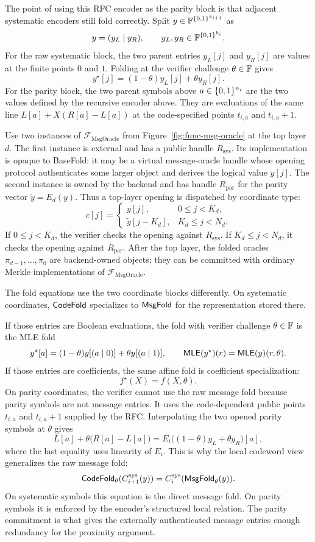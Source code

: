 The point of using this RFC encoder as the parity block is that adjacent
systematic encoders still fold correctly.  Split
$y\in\mathbb{F}^{\{0,1\}^{k_{i+1}}}$ as
\[
  y=(y_L\mid y_R),
  \qquad
  y_L,y_R\in\mathbb{F}^{\{0,1\}^{k_i}}.
\]
For the raw systematic block, the two parent entries
$y_L[j]$ and $y_R[j]$ are values at the finite points $0$ and $1$.  Folding at
the verifier challenge $\theta\in\mathbb{F}$ gives
\[
  y^\star[j]=(1-\theta)y_L[j]+\theta y_R[j].
\]
For the parity block, the two parent symbols above $a\in\{0,1\}^{n_i}$ are the two
values defined by the recursive encoder above.  They are evaluations of the same
line $L[a]+X(R[a]-L[a])$ at the code-specified points $t_{i,a}$ and
$t_{i,a}+1$.

Use two instances of $\mathcal F_{\mathrm{MsgOracle}}$ from
Figure~\ref{fig:func-msg-oracle} at the top layer $d$.  The first instance is
external and has a public handle $R_{\mathrm{sys}}$.  Its implementation is
opaque to BaseFold: it may be a virtual message-oracle handle whose opening
protocol authenticates some larger object and derives the logical value $y[j]$.  The
second instance is owned by the backend and has handle $R_{\mathrm{par}}$ for
the parity vector $\widetilde y=E_d(y)$.  Thus a top-layer opening is dispatched
by coordinate type:
\[
  c[j]=
  \begin{cases}
    y[j], & 0\le j<K_d,\\
    \widetilde y[j-K_d], & K_d\le j<N_d.
  \end{cases}
\]
If $0\le j<K_d$, the verifier checks the opening against $R_{\mathrm{sys}}$.
If $K_d\le j<N_d$, it checks the opening against $R_{\mathrm{par}}$.
After the top layer, the folded oracles
$\pi_{d-1},\ldots,\pi_0$ are backend-owned objects; they can be committed with
ordinary Merkle implementations of $\mathcal F_{\mathrm{MsgOracle}}$.

The fold equations use the two coordinate blocks differently.  On systematic
coordinates, $\mathsf{CodeFold}$ specializes to $\mathsf{MsgFold}$ for the representation stored
there.

If those entries are Boolean evaluations, the fold with verifier challenge
$\theta\in\mathbb{F}$ is the MLE fold
\[
  y^\star[a]=(1-\theta)y[(a\mid0)]+\theta y[(a\mid1)],
  \qquad
  \mathsf{MLE}(y^\star)(r)=\mathsf{MLE}(y)(r,\theta).
\]
If those entries are coefficients, the same affine fold is coefficient
specialization:
\[
  f^\star(X)=f(X,\theta).
\]
On parity coordinates, the verifier cannot use the raw message fold because
parity symbols are not message entries.  It uses the code-dependent public
points $t_{i,a}$ and $t_{i,a}+1$ supplied by the RFC.  Interpolating
the two opened parity symbols at $\theta$ gives
\[
  L[a]+\theta\bigl(R[a]-L[a]\bigr)
  =
  E_i\bigl((1-\theta)y_L+\theta y_R\bigr)[a],
\]
where the last equality uses linearity of $E_i$.  This is why the local codeword
view generalizes the raw message fold:
\[
  \mathsf{CodeFold}_\theta(C_{i+1}^{\mathrm{sys}}(y))
  =
  C_i^{\mathrm{sys}}(\mathsf{MsgFold}_\theta(y)).
\]
On systematic symbols this equation is the direct message fold.  On parity
symbols it is enforced by the encoder's structured local relation.  The parity
commitment is what gives the externally authenticated message entries enough
redundancy for the proximity argument.
